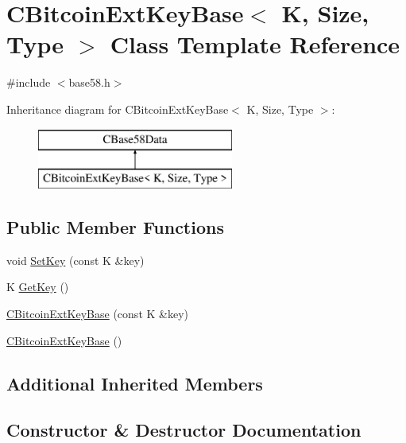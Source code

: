 \hypertarget{class_c_bitcoin_ext_key_base}{}\section{C\+Bitcoin\+Ext\+Key\+Base$<$ K, Size, Type $>$ Class Template Reference}
\label{class_c_bitcoin_ext_key_base}


{\ttfamily \#include $<$base58.\+h$>$}

Inheritance diagram for C\+Bitcoin\+Ext\+Key\+Base$<$ K, Size, Type $>$\+:\begin{figure}[H]
\begin{center}
\leavevmode
\includegraphics[height=2.000000cm]{class_c_bitcoin_ext_key_base}
\end{center}
\end{figure}
\subsection*{Public Member Functions}
\begin{DoxyCompactItemize}
\item 
void \hyperlink{class_c_bitcoin_ext_key_base_aa6041045bb68b3f24d92f5e3b96aeef6}{Set\+Key} (const K \&key)
\item 
K \hyperlink{class_c_bitcoin_ext_key_base_a528399b89529212a44a08250c5f29d68}{Get\+Key} ()
\item 
\hyperlink{class_c_bitcoin_ext_key_base_a61b09dabc0849ba24520a78c5996096a}{C\+Bitcoin\+Ext\+Key\+Base} (const K \&key)
\item 
\hyperlink{class_c_bitcoin_ext_key_base_a0f4d52b23db0a0740c4519644e537565}{C\+Bitcoin\+Ext\+Key\+Base} ()
\end{DoxyCompactItemize}
\subsection*{Additional Inherited Members}


\subsection{Constructor \& Destructor Documentation}
\hypertarget{class_c_bitcoin_ext_key_base_a61b09dabc0849ba24520a78c5996096a}{}
